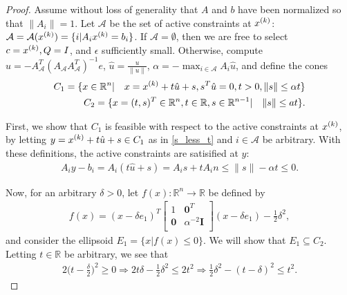 \begin{proof}
Assume without loss of generality that $A$ and $b$ have been normalized so that $\|A_i\| = 1$.
Let $\mathcal A$ be the set of active constraints at ${x^{(k)}}$: $\mathcal A = \mathcal A({x^{(k)}}) = \{ i | A_i{x^{(k)}} = b_i\}$.
If $\mathcal A = \emptyset$, then we are free to select $c = {x^{(k)}}, Q = I$, and $ \epsilon $ sufficiently small.
Otherwise, compute $u = -A_{\mathcal A}^T(A_{\mathcal A}A_{\mathcal A}^T)^{-1} e$, $\hat u = \frac {u} {\| u\|} $, $\alpha = -\max_{i \in \mathcal A} A_i \hat u$, and define the cones
\begin{align}
C_1 = \{x \in \mathbb R^n | \quad x = {x^{(k)}} + t\hat u + s, s^T\hat u = 0, t > 0, \|s\| \le \alpha t\} \label{s_less_t} \\
C_2 = \{x = (t, s)^T \in \mathbb R^n, t \in \mathbb R, s \in \mathbb R^{n-1} |\quad \|s\| \le a t \}.
\end{align}

First, we show that $C_1$ is feasible with respect to the active constraints at ${x^{(k)}}$,
by letting $y = {x^{(k)}} + t\hat u + s\in C_1$ as in \ref{s_less_t} and $i \in \mathcal A$ be arbitrary.
With these definitions, the active constraints are satisified at $y$:
\begin{align*}
A_{i}y - b_{i} = A_{i}(t\hat u + s) = A_{i}s + t A_{i}n \le \|s\| - \alpha t \le 0.
\end{align*}

Now, for an arbitrary $\delta > 0$, let 
$f(x): \mathbb R^n \to \mathbb R$ be defined by 
\begin{align*}
f(x) = (x - \delta e_1)^T\begin{bmatrix}
1 & \boldsymbol0^T \\
\boldsymbol 0 & \alpha^{-2} \boldsymbol I \\
\end{bmatrix}(x - \delta e_1) - \frac 1 2 \delta^2,
\end{align*} 
and consider the ellipsoid $E_1 = \{x | f(x) \le 0\}$.
We will show that $E_1 \subseteq C_2$.
Letting $t \in \mathbb R$ be arbitrary, we see that
\begin{align*}
2\big(t - \frac {\delta} 2\big)^2 \ge 0
\Longrightarrow 2t\delta - \frac 1 2 \delta^2 \le 2t^2 
\Longrightarrow \frac 1 2 \delta^2 - (t - \delta)^2 \le t^2. 
\end{align*}


\end{proof}
